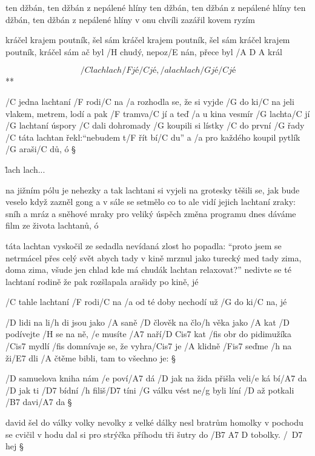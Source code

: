 ten džbán, ten džbán z nepálené hlíny
ten džbán, ten džbán z nepálené hlíny
ten džbán, ten džbán z nepálené hlíny
v onu chvíli zazářil kovem ryzím \s

kráčel krajem poutník, šel sám
kráčel krajem poutník, šel sám
kráčel krajem poutník, kráčel sám
ač byl /H chudý, nepoz/E nán, přece byl /{A D A} král




\R  \[ /C lach lach /F jé /C jé, /a lach lach /G jé /C jé \] **

/C jedna lachtaní /F rodi/C na
/a rozhodla se, že si vyjde /G do ki/C na
jeli vlakem, metrem, lodí a pak /F tramva/C jí
a teď /a u kina vesmír /G lachta/C jí
/G lachtaní úspory /C dali dohromady
/G koupili si lístky /C do první /G řady
/C táta lachtan řekl:``nebudem t/F řít bí/C du''
a /a pro každého koupil pytlík /G araši/C dů, ó \S

\r  lach lach...

na jižním pólu je nehezky
a tak lachtani si vyjeli na grotesky
těšili se, jak bude veselo
když zazněl gong a v sále se setmělo
co to ale vidí jejich lachtaní zraky:
sníh a mráz a sněhové mraky
pro veliký úspěch změna programu
dnes dáváme film ze života lachtanů, ó

\rr

táta lachtan vyskočil ze sedadla
nevídaná zlost ho popadla:
``proto jsem se netrmácel přes celý svět
abych tady v kině mrznul jako turecký med
tady zima, doma zima, všude jen chlad
kde má chudák lachtan relaxovat?''
nedivte se té lachtaní rodině
že pak rozšlapala arašidy po kině, jé

\rr

/C tahle lachtaní /F rodi/C na
/a od té doby nechodí už /G do ki/C na, jé




/D lidi na li/h di jsou jako /A saně
/D člověk na člo/h věka jako /A kat
/D podívejte /H se na ně, /e musíte /A7 naří/{D Cis7} kat
/fis obr do pidimužíka /Cis7 mydlí
/fis domnívaje se, že vyhra/Cis7 je
/A klidně /Fis7 seďme /h na ži/E7 dli
/A čtěme bibli, tam to všechno je: \S

/D samuelova kniha nám /e poví/A7 dá
/D jak na žida přišla veli/e ká bí/A7 da
/D jak ti /D7 bídní /h filiš/D7 tíni %
/G válku vést ne/g byli líní
/D až potkali /B7 davi/A7 da \S

david šel do války volky nevolky
z velké dálky nesl bratrům homolky
v pochodu se cvičil v hodu %
dal si pro strýčka příhodu
tři šutry do /{B7 A7 D} tobolky. /\ D7 hej \S

